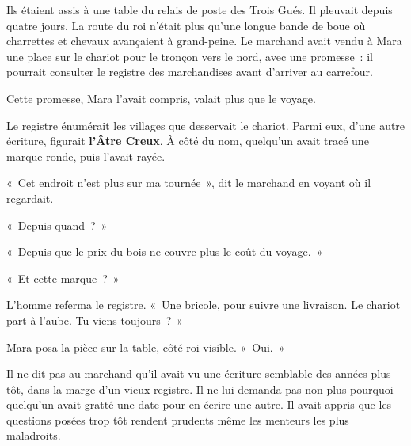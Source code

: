 \documentclass[10pt,a4paper]{article}
\begin{document}
Ils étaient assis à une table du relais de poste des Trois Gués. Il pleuvait depuis quatre jours. La route du roi n’était plus qu’une longue bande de boue où charrettes et chevaux avançaient à grand-peine. Le marchand avait vendu à Mara une place sur le chariot pour le tronçon vers le nord, avec une promesse~: il pourrait consulter le registre des marchandises avant d’arriver au carrefour.

Cette promesse, Mara l’avait compris, valait plus que le voyage.

Le registre énumérait les villages que desservait le chariot. Parmi eux, d’une autre écriture, figurait \textbf{l’Âtre Creux}. À côté du nom, quelqu’un avait tracé une marque ronde, puis l’avait rayée.

«~Cet endroit n’est plus sur ma tournée~», dit le marchand en voyant où il regardait.

«~Depuis quand~?~»

«~Depuis que le prix du bois ne couvre plus le coût du voyage.~»

«~Et cette marque~?~»

L’homme referma le registre. «~Une bricole, pour suivre une livraison. Le chariot part à l’aube. Tu viens toujours~?~»

Mara posa la pièce sur la table, côté roi visible. «~Oui.~»

Il ne dit pas au marchand qu’il avait vu une écriture semblable des années plus tôt, dans la marge d’un vieux registre. Il ne lui demanda pas non plus pourquoi quelqu’un avait gratté une date pour en écrire une autre. Il avait appris que les questions posées trop tôt rendent prudents même les menteurs les plus maladroits.
\end{document}
